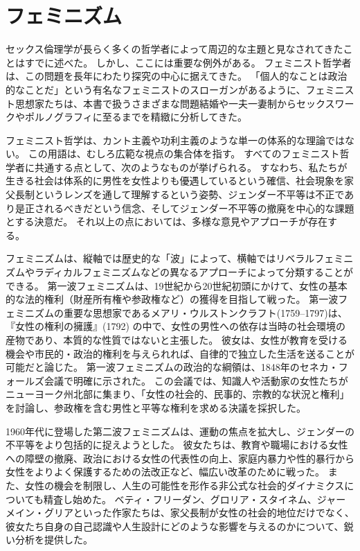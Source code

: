 \documentclass[paper=a4,book,openany]{jlreq} \usepackage{mystyle}
\begin{document}
\section{フェミニズム}

セックス倫理学が長らく多くの哲学者によって周辺的な主題と見なされてきたことはすでに述べた。
しかし、ここには重要な例外がある。
フェミニスト哲学者は、この問題を長年にわたり探究の中心に据えてきた。
「個人的なことは政治的なことだ」という有名なフェミニストのスローガンがあるように、フェミニスト思想家たちは、本書で扱うさまざまな問題{\DDASH}結婚や一夫一妻制からセックスワークやポルノグラフィに至るまで{\DDASH}を精緻に分析してきた。

フェミニスト哲学は、カント主義や功利主義のような単一の体系的な理論ではない。
この用語は、むしろ広範な視点の集合体を指す。
すべてのフェミニスト哲学者に共通する点として、次のようなものが挙げられる。
すなわち、私たちが生きる社会は体系的に男性を女性よりも優遇しているという確信、社会現象を家父長制というレンズを通して理解するという姿勢、ジェンダー不平等は不正であり是正されるべきだという信念、そしてジェンダー不平等の撤廃を中心的な課題とする決意だ。
それ以上の点においては、多様な意見やアプローチが存在する。

フェミニズムは、縦軸では歴史的な「波」によって、横軸ではリベラルフェミニズムやラディカルフェミニズムなどの異なるアプローチによって分類することができる。
第一波フェミニズムは、19世紀から20世紀初頭にかけて、女性の基本的な法的権利（財産所有権や参政権など）の獲得を目指して戦った。
第一波フェミニズムの重要な思想家であるメアリ・ウルストンクラフト(1759--1797)は、『女性の権利の擁護』(1792)\nocite{ウルストンクラーフト女性の権利}
の中で、女性の男性への依存は当時の社会環境の産物であり、本質的な性質ではないと主張した。
彼女は、女性が教育を受ける機会や市民的・政治的権利を与えられれば、自律的で独立した生活を送ることが可能だと論じた\citep{wollstonecraft93:_vindic_right_woman}。
第一波フェミニズムの政治的な綱領は、1848年のセネカ・フォールズ会議で明確に示された。
この会議では、知識人や活動家の女性たちがニューヨーク州北部に集まり、「女性の社会的、民事的、宗教的な状況と権利」を討論し、参政権を含む男性と平等な権利を求める決議を採択した\citep{parker08:_senec_falls_conven}。

1960年代に登場した第二波フェミニズムは、運動の焦点を拡大し、ジェンダーの不平等をより包括的に捉えようとした。
彼女たちは、教育や職場における女性への障壁の撤廃、政治における女性の代表性の向上、家庭内暴力や性的暴行から女性をよりよく保護するための法改正など、幅広い改革のために戦った。
また、女性の機会を制限し、人生の可能性を形作る非公式な社会的ダイナミクスについても精査し始めた。
ベティ・フリーダン、グロリア・スタイネム、ジャーメイン・グリアといった作家たちは、家父長制が女性の社会的地位だけでなく、彼女たち自身の自己認識や人生設計にどのような影響を与えるのかについて、鋭い分析を提供した。
\end{document}
